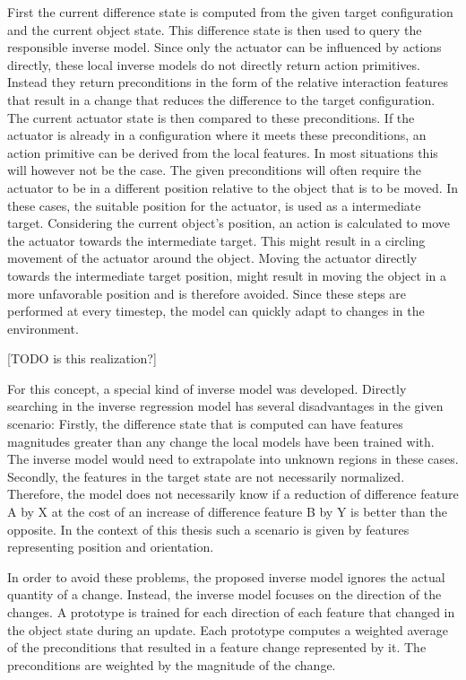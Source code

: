 First the current difference state is computed from the given target configuration and the current object state. This difference state is then used to query the responsible inverse model. Since only the actuator can be influenced by actions directly, these local inverse models do not directly return action primitives. Instead they return preconditions in the form of the relative interaction features that result in a change that reduces the difference to the target configuration. The current actuator state is then compared to these preconditions. If the actuator is already in a configuration where it meets these preconditions, an action primitive can be derived from the local features. In most situations this will however not be the case. The given preconditions will often require the actuator to be in a different position relative to the object that is to be moved. In these cases, the suitable position for the actuator, is used as a intermediate target. Considering the current object's position, an action is calculated to move the actuator towards the intermediate target. This might result in a circling movement of the actuator around the object. Moving the actuator directly towards the intermediate target position, might result in moving the object in a more unfavorable position and is therefore avoided. Since these steps are performed at every timestep, the model can quickly adapt to changes in the environment.

[TODO is this realization?]

For this concept, a special kind of inverse model was developed. Directly searching in the inverse regression model has several disadvantages in the given scenario: Firstly, the difference state that is computed can have features magnitudes greater than any change the local models have been trained with. The inverse model would need to extrapolate into unknown regions in these cases. Secondly, the features in the target state are not necessarily normalized. Therefore, the model does not necessarily know if a reduction of difference feature A by X at the cost of an increase of difference feature B by Y is better than the opposite. In the context of this thesis such a scenario is given by features representing position and orientation. 

In order to avoid these problems, the proposed inverse model ignores the actual quantity of a change. Instead, the inverse model focuses on the direction of the changes. A prototype is trained for each direction of each feature that changed in the object state during an update. Each prototype computes a weighted average of the preconditions that resulted in a feature change represented by it. The preconditions are weighted by the magnitude of the change. 

